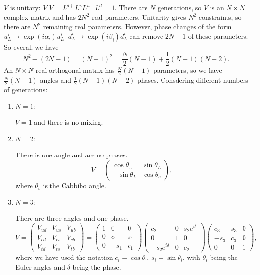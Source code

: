 $V$ is unitary: $V^\dagger V = L^{d \dagger}L^u L^{u \dagger} L^d = 1$. There are $N$ generations, so $V$ is an $N\times N$ complex matrix and has $2N^2$ real parameters. Unitarity gives $N^2$ constraints, so there are $N^2$ remaining real parameters. However, phase changes of the form $u_L^i \to \exp(i\alpha_i)u_L^i$, $d_L^i \to \exp(i\beta_i)d_L^i$ can remove $ 2N-1$ of these parameters. So overall we have 
\begin{equation}
N^2 - (2N-1) = (N-1)^2 = \frac{N}{2}(N-1) + \frac{1}{2}(N-1)(N-2).
\end{equation}
An $N\times N$ real orthogonal matrix has $\frac{N}{2}(N-1)$ parameters, so we have $\frac{N}{2}(N-1)$ angles and $\frac{1}{2}(N-1)(N-2)$ phases. Consdering different numbers of generations:
\begin{enumerate}
\item $N=1$:

$V=1$ and there is no mixing.
\item $N=2$:

There is one angle and are no phases.
\begin{equation}
V = \begin{pmatrix}
\cos\theta_L & \sin\theta_L \\
-\sin\theta_L & \cos\theta_c
\end{pmatrix},
\end{equation}
where $\theta_c$ is the Cabbibo angle.
\item $N=3$:

There are three angles and one phase.
\begin{equation}
V = \begin{pmatrix}
V_{ud} & V_{us} & V_{ub} \\
V_{cd} & V_{cs} & V_{cb} \\
V_{td} & V_{ts} & V_{tb} 
\end{pmatrix} =
\begin{pmatrix}
1 & 0 & 0 \\
0 & c_1 & s_1 \\
0 & -s_1 & c_1 
\end{pmatrix}
\begin{pmatrix}
c_2 & 0 & s_2e^{i\delta} \\
0 & 1 & 0 \\
-s_2 e^{i\delta} & 0 & c_2
\end{pmatrix}
\begin{pmatrix}
c_3 & s_3 & 0 \\
-s_3 & c_3 & 0 \\
0 & 0 & 1
\end{pmatrix},
\end{equation}
where we have used the notation $c_i = \cos\theta_i$, $s_i = \sin\theta_i$, with $\theta_i$ being the Euler angles and $\delta$ being the phase.
\end{enumerate}
